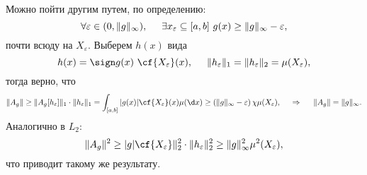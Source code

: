 Можно пойти другим путем, по определению:
\begin{equation*}
    \forall \varepsilon \in (0, \|g\|_\infty), \hspace{5 mm} 
    \exists x_\varepsilon \subseteq [a, b] \ 
    g(x) \geq \|g\|_\infty - \varepsilon,
\end{equation*}
почти всюду на $X_\varepsilon$. Выберем $h(x)$ вида
\begin{equation*}
    h(x) = \sign g(x) \ \cf{X_\varepsilon} (x),
    \hspace{5 mm} 
    \|h_\varepsilon\|_1 = \|h_\varepsilon\|_2 = \mu(X_\varepsilon), 
\end{equation*}
тогда верно, что
\begin{equation*}
    \|A_g\| \geq \|A_g [h_\varepsilon]\|_1 \cdot \|h_\varepsilon\|_1 = \int_{[a, b]} |g(x)| \cf{X_\varepsilon} (x) \mu(\d x) \geq \left(
        \|g\|_{\infty} - \varepsilon
    \right) \chi \mu(X_\varepsilon),
    \hspace{0.5cm} \Rightarrow \hspace{0.5cm}
    \|A_g\| = \|g\|_\infty.
\end{equation*}
Аналогично в $L_2$:
\begin{equation*}
    \|A_g\|^2 \geq \\|g| \cf{X_\varepsilon}\|_2^2 \cdot \|h_\varepsilon\|_2^2 \geq \|g\|_\infty^2 \mu^2(X_\varepsilon),
\end{equation*}
что приводит такому же результату. 

